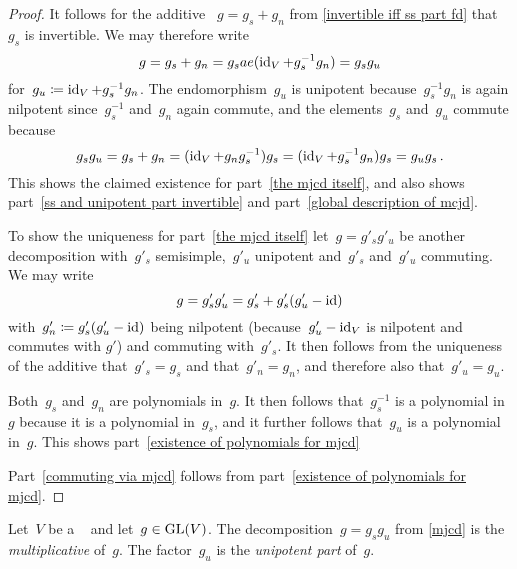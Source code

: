 \begin{proof}
  It follows for the additive {\JCD}~$g = g_s + g_n$ from \cref{invertible iff ss part fd} that~$g_s$ is invertible.
  We may therefore write
  \[
      g
    = g_s + g_n
    = g_s ae(\operatorname{id}_V + g_s^{-1} g_n)
    = g_s g_u
  \]
  for~$g_u \coloneqq \operatorname{id}_V + g_s^{-1} g_n$.
  The endomorphism~$g_u$ is unipotent because~$g_s^{-1} g_n$ is again nilpotent since~$g_s^{-1}$ and~$g_n$ again commute, and the elements~$g_s$ and~$g_u$ commute because
  \[
      g_s g_u
    = g_s + g_n
    = (\operatorname{id}_V + g_n g_s^{-1}) g_s
    = (\operatorname{id}_V + g_s^{-1} g_n) g_s
    = g_u g_s \,.
  \]
  This shows the claimed existence for part~\ref*{the mjcd itself}, and also shows part~\ref*{ss and unipotent part invertible} and part~\ref*{global description of mcjd}.
  
  To show the uniqueness for part~\ref*{the mjcd itself} let~$g = g'_s g'_u$ be another decomposition with~$g'_s$ semisimple,~$g'_u$ unipotent and~$g'_s$ and~$g'_u$ commuting.
  We may write
  \[
      g
    = g'_s g'_u
    = g'_s + g'_s (g'_u - \operatorname{id})
  \]
  with~$g'_n \coloneqq g'_s (g'_u - \operatorname{id})$ being nilpotent (because~$g'_u - \operatorname{id}_V$ is nilpotent and commutes with $g'$) and commuting with~$g'_s$.
  It then follows from the uniqueness of the additive {\JCD} that~$g'_s = g_s$ and that~$g'_n = g_n$, and therefore also that~$g'_u = g_u$.
  
  Both~$g_s$ and~$g_n$ are polynomials in~$g$.
  It then follows that~$g_s^{-1}$ is a polynomial in~$g$ because it is a polynomial in~$g_s$, and it further follows that~$g_u$ is a polynomial in~$g$.
  This shows part~\ref*{existence of polynomials for mjcd}
  
  Part~\ref*{commuting via mjcd} follows from part~\ref*{existence of polynomials for mjcd}.
\end{proof}


\begin{definition}
  \label{mjcd definition}
  Let~$V$ be a ~ and let~$g \in \operatorname{GL}(V)$.
  The decomposition~$g = g_s g_u$ from \cref{mjcd} is the \emph{multiplicative {\JCD}} of~$g$.
  The factor~$g_u$ is the \emph{unipotent part} of~$g$.
\end{definition}


